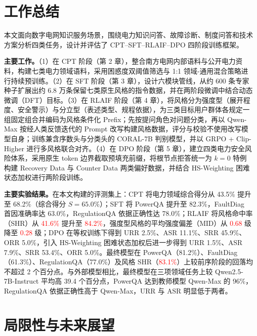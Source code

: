 \documentclass[fontset=fandol,type=master,campus=shenzhen,etitleauto=true]{hithesisbook}
\newcommand{\rev}[1]{\textcolor{red}{#1}}
\begin{document}
\backmatter
\begin{conclusions}
\label{ux603bux7ed3ux4e0eux5c55ux671b}

\section*{工作总结}\label{ux5de5ux4f5cux603bux7ed3}

本文面向数字电网知识服务场景，围绕电力知识问答、故障诊断、制度问答和技术方案分析四类任务，设计并评估了 CPT--SFT--RLAIF--DPO 四阶段训练框架。

\textbf{主要工作。}（1）在 CPT 阶段（第 2 章），整合南方电网内部语料与公开电力资料，构建七类电力领域语料，采用困惑度双阈值筛选与 1:1 领域-通用混合策略进行持续预训练。（2）在 SFT 阶段（第 3 章），设计六模块管线，从约 600 条专家种子扩展出约 6.8 万条保留七类原生风格的指令数据，并在两阶段微调中结合动态微调（DFT）目标。（3）在 RLAIF 阶段（第 4 章），将风格分为强度型（展开程度、安全警示）与分立型（表述类型、规程依据），为三类目标用户群体各规定一组固定组合并编码为风格条件化 Prefix；先按提问角色对问题分类，再以 Qwen-Max 按经人类反馈迭代的 Prompt 改写构建风格数据，评分与校验不使用改写模型自身；训练兼含序数头与分类头的 CORAL-7B 判别模型，并以 GRPO + Clip-Higher 进行多风格联合对齐。（4）在 DPO 阶段（第 5 章），建立四类电力安全风险体系，采用原生 token 边界截取预填充前缀，将根节点拒答统一为 $k=0$ 特例构建 Recovery Data 与 Counter Data 两类偏好数据，并结合 HS-Weighting 困难状态加权进行两阶段训练。

\textbf{主要实验结果。}在本文构建的评测集上：CPT 将电力领域综合得分从 43.5\% 提升至 68.2\%（综合得分 $S=65.0\%$）；SFT 将 PowerQA 提升至 82.3\%，FaultDiag 首因准确率达 63.0\%，RegulationQA 依据正确性达 78.0\%；RLAIF 将风格命中率（SHR）从 \rev{41.6\%} 提升至 \rev{84.2\%}，强度型风格的平均强度偏差（MID）从 \rev{0.68} 级降至 \rev{0.28} 级；DPO 在等权训练下得到 URR 2.5\%、ASR 11.1\%、SRR 45.9\%、ORR 5.0\%，引入 HS-Weighting 困难状态加权后进一步得到 URR 1.5\%、ASR 7.9\%、SRR 53.4\%、ORR 5.0\%。最终模型在 PowerQA（81.2\%）、FaultDiag（61.3\%）、RegulationQA（77.0\%）及风格 SHR（\rev{83.1\%}）上较前序阶段的回落均不超过 2 个百分点。与外部模型相比，最终模型在三项领域任务上较 Qwen2.5-7B-Instruct 平均高 39.4 个百分点，PowerQA 达到教师模型 Qwen-Max 的 96\%，RegulationQA 依据正确性高于 Qwen-Max，URR 与 ASR 明显低于两者。

\section*{局限性与未来展望}\label{ux5c40ux9650ux6027ux4e0eux672aux6765ux5c55ux671b}


\end{conclusions}
\end{document}
